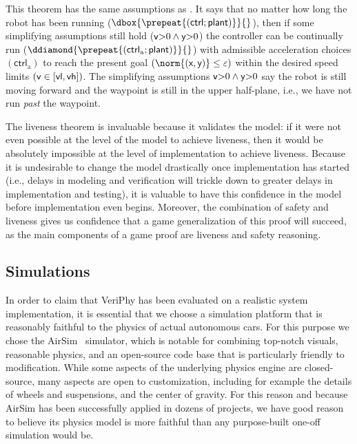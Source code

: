 \documentclass[12pt]{cmuthesis}
\theoremstyle{definition}
\theoremstyle{remark}
\newcommand{\xgvar}{\textsf{x}}
\newcommand{\ygvar}{\textsf{y}}
\newcommand{\yvar}{\textsf{y}}
\newcommand{\vlvar}{\textsf{vl}}
\newcommand{\vhvar}{\textsf{vh}}
\newcommand{\vvar}{{\sf v}\xspace}
\newcommand{\ctrl}{\textsf{ctrl}\xspace}
\newcommand{\ctrlliv}{\ctrl_{\text{a}}}
\newcommand{\plant}{\textsf{plant}\xspace}
\newcommand{\enorm}[1]{\norm{#1}}
\newcommand{\rref}[2][]{\prettyref{#2}}
\newcommand{\VeriPhy}{VeriPhy\xspace}
\begin{document}
This theorem has the same assumptions as \rref{thm:safe}. 
It says that no matter how long the robot has been running ($\dbox{\prepeat{(\ctrl;\plant)}}{}$), 
then if some simplifying assumptions still hold ($\vvar{>}0\land\yvar{>}0$) 
the controller can be continually run ($\ddiamond{\prepeat{(\ctrlliv;\plant)}}{}$) with admissible acceleration choices $(\ctrlliv)$ to reach the present goal \((\enorm{(\xgvar,\ygvar)} \leq \veps)\) within the desired speed limits \((\vvar \in [\vlvar,\vhvar])\).
The simplifying assumptions $\vvar{>}0\land\yvar{>}0$ say the robot is still moving forward and the waypoint is still in the upper half-plane, i.e., we have not run \emph{past} the waypoint.

The liveness theorem is invaluable because it validates the \dL model: if it were not even possible at the level of the \dL model to achieve liveness, then it would be absolutely impossible at the level of implementation to achieve liveness.
Because it is undesirable to change the model drastically once implementation has started (i.e., delays in modeling and verification will trickle down to greater delays in implementation and testing), it is valuable to have this confidence in the model before implementation even begins.
Moreover, the combination of safety and liveness gives us confidence that a game generalization of this proof will succeed, as the main components of a game proof are liveness and safety reasoning.

\subsection{Simulations} 
In order to claim that \VeriPhy has been evaluated on a realistic system implementation, it is essential that we choose a simulation platform that is reasonably faithful to the physics of actual autonomous cars.
For this purpose we chose the AirSim~\cite{shah2018airsim} simulator, which is notable for combining top-notch visuals, reasonable physics, and an open-source code base that is particularly friendly to modification.
While some aspects of the underlying physics engine are closed-source, many aspects are open to customization, including for example the details of wheels and suspensions, and the center of gravity.
For this reason and because AirSim has been successfully applied in dozens of projects, we have good reason to believe its physics model is more faithful than any purpose-built one-off simulation would be.
\end{document}
